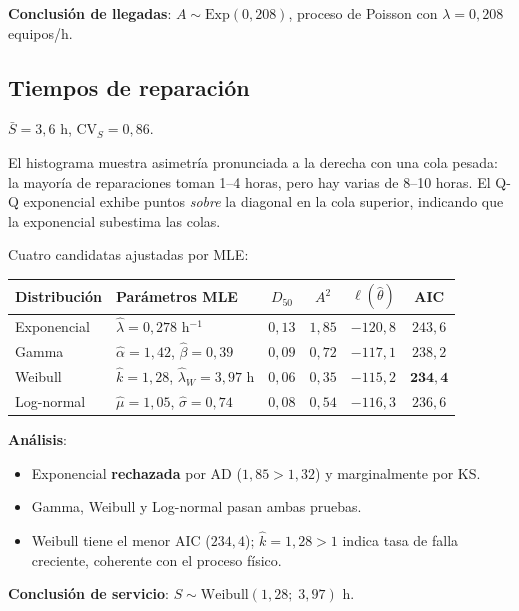 \documentclass[11pt, letterpaper]{article}
\begin{document}
\textbf{Conclusión de llegadas}: $A \sim \text{Exp}(0{,}208)$, proceso de Poisson con $\lambda=0{,}208$ equipos/h.

\subsection{Tiempos de reparación}

$\bar{S}=3{,}6$ h, $\text{CV}_S=0{,}86$.

El histograma muestra asimetría pronunciada a la derecha con una cola pesada: la mayoría de reparaciones toman 1--4 horas, pero hay varias de 8--10 horas. El Q-Q exponencial exhibe puntos \emph{sobre} la diagonal en la cola superior, indicando que la exponencial subestima las colas.

Cuatro candidatas ajustadas por MLE:

\begin{center}\small
\renewcommand{\arraystretch}{1.3}
\begin{tabular}{llcccc}
\toprule
\textbf{Distribución} & \textbf{Parámetros MLE} & $D_{50}$ & $A^2$ & $\ell(\hat\theta)$ & \textbf{AIC} \\
\midrule
Exponencial & $\hat\lambda=0{,}278$ h$^{-1}$ & $0{,}13$ & $1{,}85$ & $-120{,}8$ & $243{,}6$ \\
Gamma       & $\hat\alpha=1{,}42$, $\hat\beta=0{,}39$ & $0{,}09$ & $0{,}72$ & $-117{,}1$ & $238{,}2$ \\
Weibull     & $\hat{k}=1{,}28$, $\hat\lambda_W=3{,}97$ h & $0{,}06$ & $0{,}35$ & $-115{,}2$ & $\mathbf{234{,}4}$ \\
Log-normal  & $\hat\mu=1{,}05$, $\hat\sigma=0{,}74$ & $0{,}08$ & $0{,}54$ & $-116{,}3$ & $236{,}6$ \\
\bottomrule
\end{tabular}
\end{center}

\textbf{Análisis}:
\begin{itemize}
    \item Exponencial \textbf{rechazada} por AD ($1{,}85 > 1{,}32$) y marginalmente por KS.
    \item Gamma, Weibull y Log-normal pasan ambas pruebas.
    \item Weibull tiene el menor AIC ($234{,}4$); $\hat k = 1{,}28 > 1$ indica tasa de falla creciente, coherente con el proceso físico.
\end{itemize}

\textbf{Conclusión de servicio}: $S \sim \text{Weibull}(1{,}28;\; 3{,}97)$ h.
\end{document}
